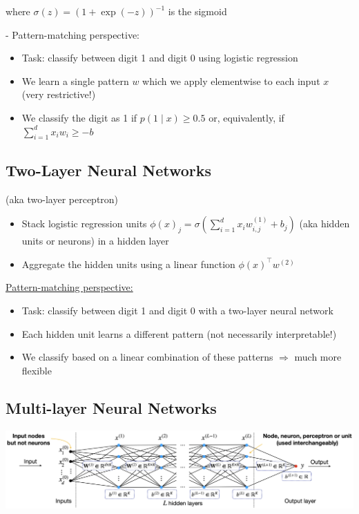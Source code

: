 where $\sigma(z)=(1+\exp (-z))^{-1}$ is the sigmoid

- Pattern-matching perspective:

\begin{itemize}
  \item Task: classify between digit 1 and digit 0 using logistic regression

  \item We learn a single pattern $w$ which we apply elementwise to each input $x$ (very restrictive!)

  \item We classify the digit as 1 if $p(1 \mid x) \geq 0.5$ or, equivalently, if $\sum_{i=1}^{d} x_{i} w_{i} \geq-b$

\end{itemize}

\subsection*{Two-Layer Neural Networks}
(aka two-layer perceptron)

\begin{itemize}
  \item Stack logistic regression units $\phi(x)_{j}=\sigma\left(\sum_{i=1}^{d} x_{i} w_{i, j}^{(1)}+b_{j}\right)$ (aka hidden units or neurons) in a hidden layer

  \item Aggregate the hidden units using a linear function $\phi(x)^{\top} w^{(2)}$

\end{itemize}

\underline{Pattern-matching perspective:}

\begin{itemize}
  \item Task: classify between digit 1 and digit 0 with a two-layer neural network

  \item Each hidden unit learns a different pattern (not necessarily interpretable!)

  \item We classify based on a linear combination of these patterns $\Rightarrow$ much more flexible

\end{itemize}

\subsection*{Multi-layer Neural Networks}
\includegraphics*[width=\columnwidth]{figures/nn1.png}

